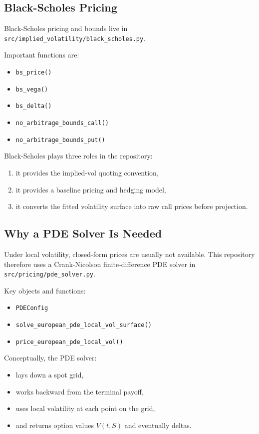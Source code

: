 \documentclass[11pt]{article}
\begin{document}
\subsection{Black-Scholes Pricing}

Black-Scholes pricing and bounds live in
\texttt{src/implied\_volatility/black\_scholes.py}.

Important functions are:

\begin{itemize}
  \item \texttt{bs\_price()}
  \item \texttt{bs\_vega()}
  \item \texttt{bs\_delta()}
  \item \texttt{no\_arbitrage\_bounds\_call()}
  \item \texttt{no\_arbitrage\_bounds\_put()}
\end{itemize}

Black-Scholes plays three roles in the repository:

\begin{enumerate}
  \item it provides the implied-vol quoting convention,
  \item it provides a baseline pricing and hedging model,
  \item it converts the fitted volatility surface into raw call prices before projection.
\end{enumerate}

\subsection{Why a PDE Solver Is Needed}

Under local volatility, closed-form prices are usually not available. This repository therefore uses a Crank-Nicolson finite-difference PDE solver in
\texttt{src/pricing/pde\_solver.py}.

Key objects and functions:

\begin{itemize}
  \item \texttt{PDEConfig}
  \item \texttt{solve\_european\_pde\_local\_vol\_surface()}
  \item \texttt{price\_european\_pde\_local\_vol()}
\end{itemize}

Conceptually, the PDE solver:

\begin{itemize}
  \item lays down a spot grid,
  \item works backward from the terminal payoff,
  \item uses local volatility at each point on the grid,
  \item and returns option values $V(t,S)$ and eventually deltas.
\end{itemize}
\end{document}
